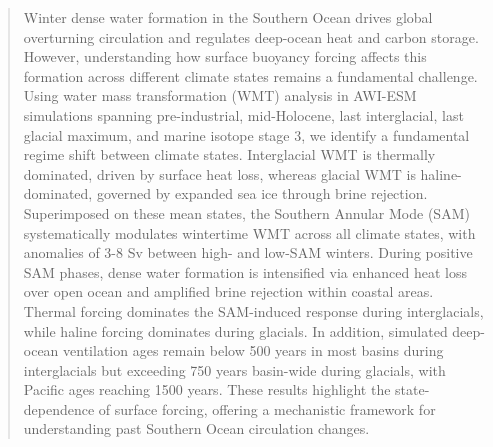 \documentclass[draft]{agujournal2025}
\begin{document}
\begin{abstract}
Winter dense water formation in the Southern Ocean drives global overturning circulation and regulates deep-ocean heat and carbon storage. However, understanding how surface buoyancy forcing affects this formation across different climate states remains a fundamental challenge. Using water mass transformation (WMT) analysis in AWI-ESM simulations spanning pre-industrial, mid-Holocene, last interglacial, last glacial maximum, and marine isotope stage 3, we identify a fundamental regime shift between climate states.  Interglacial WMT is thermally dominated, driven by surface heat loss, whereas glacial WMT is haline-dominated, governed by expanded sea ice through brine rejection. Superimposed on these mean states, the Southern Annular Mode (SAM) systematically modulates wintertime WMT across all  climate states, with anomalies of 3-8 Sv between high- and low-SAM winters. During positive SAM phases, dense water formation is intensified via enhanced heat loss over open ocean and amplified brine rejection within coastal areas. Thermal forcing dominates the SAM-induced response during interglacials, while haline forcing dominates during glacials.  In addition, simulated deep-ocean ventilation ages remain below 500 years in most basins during interglacials but exceeding 750 years basin-wide during glacials, with Pacific ages reaching 1500 years.
These results highlight the state-dependence of surface forcing, offering a mechanistic framework for understanding past Southern Ocean circulation changes.




\end{abstract}
\end{document}
